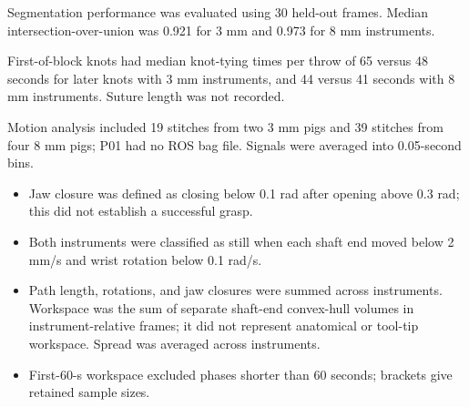 \clearpage
\twocolumn
{}
\label{sec:supplement}

Segmentation performance was evaluated using 30 held-out frames. Median intersection-over-union was 0.921 for 3 mm and 0.973 for 8 mm instruments.








First-of-block knots had median knot-tying times per throw of 65 versus 48 seconds for later knots with 3 mm instruments, and 44 versus 41 seconds with 8 mm instruments. Suture length was not recorded.

Motion analysis included 19 stitches from two 3 mm pigs and 39 stitches from four 8 mm pigs; P01 had no ROS bag file. Signals were averaged into 0.05-second bins.

\begin{itemize}
\item Jaw closure was defined as closing below 0.1 rad after opening above 0.3 rad; this did not establish a successful grasp.
\item Both instruments were classified as still when each shaft end moved below 2 mm/s and wrist rotation below 0.1 rad/s.
\item Path length, rotations, and jaw closures were summed across instruments. Workspace was the sum of separate shaft-end convex-hull volumes in instrument-relative frames; it did not represent anatomical or tool-tip workspace. Spread was averaged across instruments.
\item First-60-s workspace excluded phases shorter than 60 seconds; brackets give retained sample sizes.
\end{itemize}



